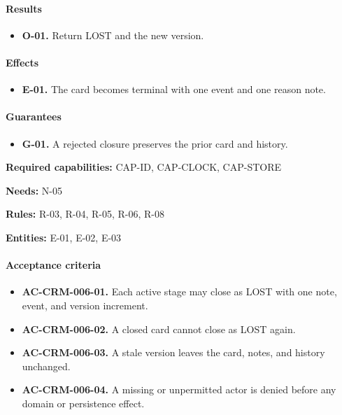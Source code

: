 \documentclass[10pt,a4paper]{article}
\begin{document}
\paragraph{Results}

\begin{itemize}

\item \textbf{O-01.} Return LOST and the new version.

\end{itemize}

\paragraph{Effects}

\begin{itemize}

\item \textbf{E-01.} The card becomes terminal with one event and one reason note.

\end{itemize}

\paragraph{Guarantees}

\begin{itemize}

\item \textbf{G-01.} A rejected closure preserves the prior card and history.

\end{itemize}

\textbf{Required capabilities:} CAP-ID, CAP-CLOCK, CAP-STORE

\textbf{Needs:} N-05

\textbf{Rules:} R-03, R-04, R-05, R-06, R-08

\textbf{Entities:} E-01, E-02, E-03

\paragraph{Acceptance criteria}

\begin{itemize}

\item \textbf{AC-CRM-006-01.} Each active stage may close as LOST with one note, event, and version increment.

\item \textbf{AC-CRM-006-02.} A closed card cannot close as LOST again.

\item \textbf{AC-CRM-006-03.} A stale version leaves the card, notes, and history unchanged.

\item \textbf{AC-CRM-006-04.} A missing or unpermitted actor is denied before any domain or persistence effect.

\end{itemize}
\end{document}
